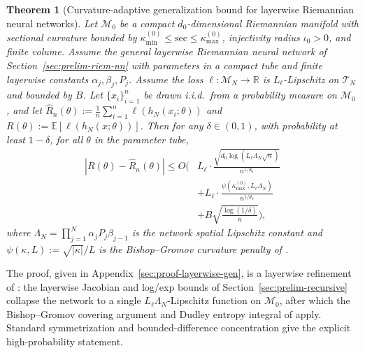 \documentclass[letterpaper]{article}
\newtheorem{theorem}{Theorem}
\begin{document}
\begin{theorem}[Curvature-adaptive generalization bound for layerwise Riemannian neural networks]
\label{thm:layerwise-generalization}
Let $\mathcal M_0$ be a compact $d_0$-dimensional Riemannian manifold
with sectional curvature bounded by
$\kappa_{\min}^{(0)} \le \mathrm{sec} \le \kappa_{\max}^{(0)}$, injectivity
radius $\iota_0 > 0$, and finite volume. Assume the general layerwise
Riemannian neural network of Section~\ref{sec:prelim-riem-nn} with
parameters in a compact tube and finite layerwise constants
$\alpha_j, \beta_j, P_j$. Assume the loss
$\ell : \mathcal M_N \to \mathbb R$ is $L_\ell$-Lipschitz on $\mathcal T_N$
and bounded by $B$. Let $\{x_i\}_{i=1}^n$ be drawn i.i.d.\ from a
probability measure on $\mathcal M_0$, and let
$\hat R_n(\theta) := \tfrac1n \sum_{i=1}^n \ell(h_N(x_i;\theta))$ and
$R(\theta) := \mathbb E[\ell(h_N(x;\theta))]$. Then for any
$\delta \in (0,1)$, with probability at least $1-\delta$, for all
$\theta$ in the parameter tube,
\begin{equation}
\label{eq:layerwise-gen}
\begin{aligned}
|R(\theta) - \hat R_n(\theta)|
\le
O\Bigg(
& L_\ell \cdot
\frac{\sqrt{d_0 \log(L_\ell \Lambda_N \sqrt n)}}{n^{1/d_0}}\\
& + L_\ell \cdot
\frac{\psi(\kappa_{\max}^{(0)}, L_\ell \Lambda_N)}{n^{1/d_0}}\\
& + B \sqrt{\frac{\log(1/\delta)}{n}}
\Bigg),
\end{aligned}
\end{equation}
where $\Lambda_N = \prod_{j=1}^N \alpha_j P_j \beta_{j-1}$ is the network
spatial Lipschitz constant and $\psi(\kappa, L) := \sqrt{|\kappa|}/L$ is
the Bishop--Gromov curvature penalty of \cite{sarkar2025learning}.
\end{theorem}

The proof, given in Appendix~\ref{sec:proof-layerwise-gen}, is a
layerwise refinement of \cite{sarkar2025learning}: the layerwise
Jacobian and log/exp bounds of Section~\ref{sec:prelim-recursive}
collapse the network to a single $L_\ell \Lambda_N$-Lipschitz function on
$\mathcal M_0$, after which the Bishop--Gromov covering argument and
Dudley entropy integral of \cite{sarkar2025learning} apply. Standard
symmetrization and bounded-difference concentration give the explicit
high-probability statement.
\end{document}
